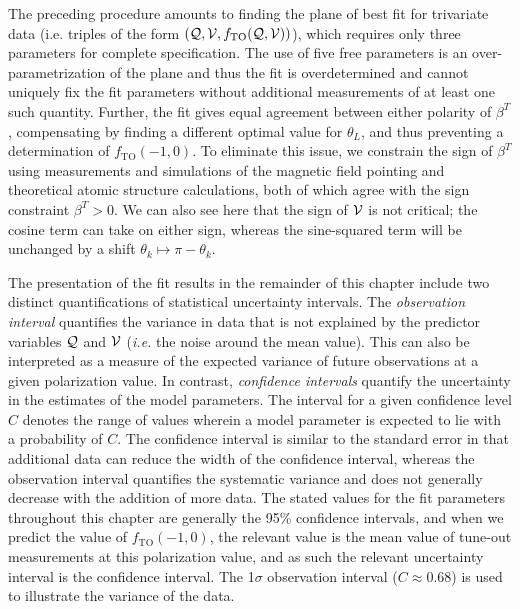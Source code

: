	The preceding procedure amounts to finding the plane of best fit for trivariate data (i.e. triples of the form $(\mathcal{Q},\mathcal{V},f_{\mathrm{TO}}(\mathcal{Q,V}))$), which requires only three parameters for complete specification. The use of five free parameters is an over-parametrization of the plane and thus the fit is overdetermined and cannot uniquely fix the fit parameters without additional measurements of at least one such quantity.	
	Further, the fit gives equal agreement between either polarity of \( \beta^T \), compensating by finding a different optimal value for $\theta_L$, and thus preventing a determination of \(f_{\mathrm{TO}}(-1,0)\). 
	To eliminate this issue, we constrain the sign of \( \beta^T \) using measurements and simulations of the magnetic field pointing and theoretical atomic structure calculations, both of which agree with the sign constraint \( \beta^T >0 \).
	We can also see here that the sign of $\mathcal{V}$ is not critical; the cosine term can take on either sign, whereas the sine-squared term will be unchanged by a shift $\theta_k\mapsto\pi-\theta_k$.
	
	The presentation of the fit results in the remainder of this chapter include two distinct quantifications of statistical uncertainty intervals. The \emph{observation interval} quantifies the variance in data that is not explained by the predictor variables $\mathcal{Q}$ and $\mathcal{V}$ (\emph{i.e.} the noise around the mean value). This can also be interpreted as a measure of the expected variance of future observations at a given polarization value. In contrast, \emph{confidence intervals} quantify the uncertainty in the estimates of the model parameters. The  interval for a given confidence level $C$ denotes the range of values wherein a model parameter is expected to lie with a probability of $C$. 
	The confidence interval is similar to the standard error in that additional data can reduce the width of the confidence interval, whereas the observation interval quantifies the systematic variance and does not generally decrease with the addition of more data.
	The stated values for the fit parameters throughout this chapter are generally the 95\% confidence intervals, and when we predict the value of $f_\mathrm{TO}(-1,0)$, the relevant value is the mean value of tune-out measurements at this polarization value, and as such the relevant uncertainty interval is the confidence interval. The 1$\sigma$ observation interval ($C\approx 0.68$) is used to illustrate the variance of the data.

